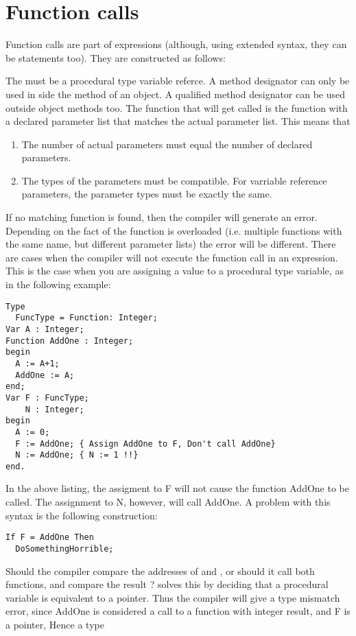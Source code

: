 \documentclass{report}
\begin{document}
\section{Function calls}
Function calls are part of expressions (although, using extended syntax,
they can be statements too). They are constructed as follows:

The  must be a procedural type variable referce.
A method designator can only be used in side the method of an object. A
qualified method designator can be used outside object methods too.
The function that will get called is the function with a declared parameter
list that matches the actual parameter list. This means that
\begin{enumerate}
\item The number of actual parameters must equal the number of declared
parameters.
\item The types of the parameters must be compatible. For varriable
reference parameters, the parameter types must be exactly the same.
\end{enumerate}
If no matching function is found, then the compiler will generate an error.
Depending on the fact of the function is overloaded (i.e. multiple functions
with the same name, but different parameter lists) the error will be
different.
There are cases when the compiler will not execute the function call in an
expression. This is the case when you are assigning a value to a procedural
type variable, as in the following example:
\begin{verbatim}
Type
  FuncType = Function: Integer;
Var A : Integer;
Function AddOne : Integer;
begin
  A := A+1;
  AddOne := A;
end;
Var F : FuncType;
    N : Integer;
begin
  A := 0;
  F := AddOne; { Assign AddOne to F, Don't call AddOne}
  N := AddOne; { N := 1 !!}
end.
\end{verbatim}
In the above listing, the assigment to F will not cause the function AddOne
to be called. The assignment to N, however, will call AddOne.
A problem with this syntax is the following construction:
\begin{verbatim}
If F = AddOne Then
  DoSomethingHorrible;
\end{verbatim}
Should the compiler compare the addresses of  and ,
or should it call both functions, and compare the result ? \fpc solves this
by deciding that a procedural variable is equivalent to a pointer. Thus the
compiler will give a type mismatch error, since AddOne is considered a
call to a function with integer result, and F is a pointer, Hence a type
\end{document}
